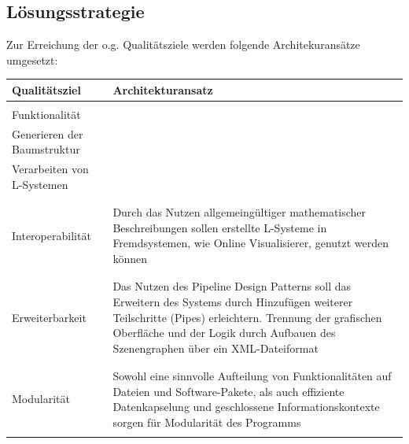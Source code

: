 \subsection*{Lösungsstrategie}
Zur Erreichung der o.g. Qualitätsziele werden folgende Architekuransätze umgesetzt:
\begin{center}
    \begin{tabular}{l|l}
        \textbf{Qualitätsziel} & \textbf{Architekturansatz} \\
        \hline \\
        Funktionalität &
        \begin{minipage}[t]{0.8\textwidth}
            Grafische Benutzerschnittstelle\\
            Generieren der Baumstruktur\\
            Verarbeiten von L-Systemen
        \end{minipage} \\
        \\ \hline \\
        Interoperabilität &
        \begin{minipage}[t]{0.8\textwidth}
            Durch das Nutzen allgemeingültiger mathematischer Beschreibungen sollen erstellte
            L-Systeme in Fremdsystemen, wie Online Visualisierer, genutzt werden können
        \end{minipage} \\
        \\ \hline \\
        Erweiterbarkeit &
        \begin{minipage}[t]{0.8\textwidth}
            Das Nutzen des Pipeline Design Patterns soll das Erweitern des Systems durch
            Hinzufügen weiterer Teilschritte (Pipes) erleichtern.
            Trennung der grafischen Oberfläche und der Logik durch Aufbauen des Szenengraphen über ein
            XML-Dateiformat
        \end{minipage} \\
        \\ \hline \\
        Modularität &
        \begin{minipage}[t]{0.8\textwidth}
            Sowohl eine sinnvolle Aufteilung von Funktionalitäten auf Dateien und Software-Pakete, als
            auch effiziente Datenkapselung und geschlossene Informationskontexte sorgen für Modularität des
            Programms
        \end{minipage} \\
        \\ \hline
    \end{tabular}
\end{center}

